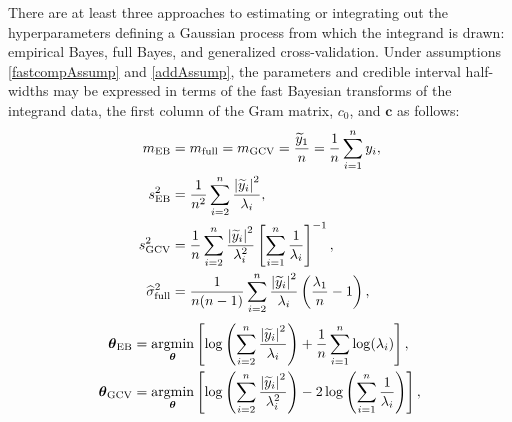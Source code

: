 \documentclass{svjour3}                     %
\newcommand{\bm}[1]{\boldsymbol{#1}}
\newcommand{\vtheta}{{\bm{\theta}}}
\newcommand{\vc}{\bm{c}}
\newcommand{\MLE}{\textup{EB}}
\newcommand{\full}{\textup{full}}
\newcommand{\GCV}{\textup{GCV}}
\def\abs#1{\ensuremath{\left \lvert #1 \right \rvert}}
\providecommand{\argmin}{\operatorname*{argmin}}
\begin{document}
\begin{theorem} \label{thm:param} There are at least three approaches to estimating or integrating out the hyperparameters defining a Gaussian process from which the integrand is drawn: empirical Bayes, full Bayes, and generalized cross-validation.  
	Under assumptions \eqref{fastcompAssump} and \eqref{addAssump}, the parameters and credible interval half-widths 
	may be expressed in terms of the fast Bayesian transforms of the integrand data, the first column of the Gram matrix, $c_0$, and $\vc$ as follows:
	\begin{subequations}
		\begin{align}
		\nonumber
		m_\MLE &=  m_{\full} = m_{\GCV} =  \frac{\widetilde{y}_1}{n} = \frac 1n \sum_{i=1}^n y_i,
		\\
		\nonumber
		s^2_\MLE 
		& =
		\frac{1}{n^2} 
		\sum_{i=2}^n \frac{\abs{\widetilde{y}_i}^2}{\lambda_i},  \\
		\nonumber 
		s^2_{\textup{GCV}} & =  \frac 1{n} \sum_{i=2}^n \frac{\abs{\widetilde{y}_i}^2}{\lambda_i^2}  \left [ \sum_{i=1}^n \frac{1}{\lambda_i} \right]^{-1}, \\
		\nonumber
		\widehat{\sigma}^2_{\textup{full}} &= \frac{1}{n(n-1)} \sum_{i=2}^n \frac{\abs{\widetilde{y}_i}^2}{\lambda_i}  \left(\frac{\lambda_1}{n}  - 1  \right), 
		\end{align}
	\end{subequations}
	\begin{subequations}
		\label{fastTheta}
		\begin{align}
		\label{fastThetaMLE}
		\vtheta_\MLE
		&= 
		\argmin_{\vtheta}
		\left[
		\log\left(
		\sum_{i=2}^n \frac{\abs{\widetilde{y}_i}^2}{\lambda_{i}}
		\right) 
		+ \frac{1}{n}\sum_{i=1}^n \log(\lambda_{i})
		\right],\\
		\label{fastThetaGCV} 
		\vtheta_{\GCV} 
		&= \argmin_\vtheta \left[ \log \left ( \sum_{i=2}^n \frac{\abs{\widetilde{y}_i}^2}{\lambda_{i}^2} 
		\right)  
		-2\log\left( \sum_{i=1}^n \frac{1}{\lambda_{i}} \right)
		\right], 

\end{align}
\end{subequations}
\end{theorem}
\end{document}
